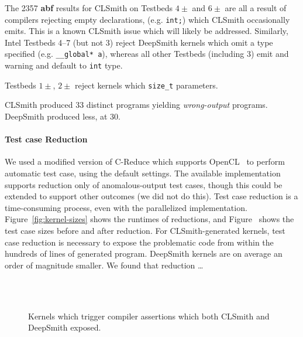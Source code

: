 The 2357 \textbf{abf} results for CLSmith on Testbeds $4\pm$ and $6\pm$ are all a result of compilers rejecting empty declarations, (e.g. \texttt{int;}) which CLSmith occasionally emits. This is a known CLSmith issue which will likely be addressed.
Similarly, Intel Testbeds 4--7 (but not 3) reject DeepSmith kernels which omit a type specified (e.g. \texttt{\_\_global* a}), whereas all other Testbeds (including 3) emit and warning and default to \texttt{int} type.

Testbeds $1\pm$, $2\pm$ reject kernels which \texttt{size\_t} parameters.

CLSmith produced 33 distinct programs yielding \emph{wrong-output} programs. DeepSmith produced less, at 30.


\paragraph{Test case Reduction} We used a modified version of C-Reduce which supports OpenCL~\cite{Pflanzer2016} to perform automatic test case, using the default settings. The available implementation supports reduction only of anomalous-output test cases, though this could be extended to support other outcomes (we did not do this). Test case reduction is a time-consuming process, even with the parallelized implementation. Figure~\ref{fig:kernel-sizes} shows the runtimes of reductions, and Figure~ shows the test case sizes before and after reduction. For CLSmith-generated kernels, test case reduction is necessary to expose the problematic code from within the hundreds of lines of generated program. DeepSmith kernels are on average an order of magnitude smaller. We found that reduction \ldots


\begin{figure}
  \centering %
  \\%
  \\%
  \caption{Kernels which trigger compiler assertions which both CLSmith and DeepSmith exposed.}%
  \label{lst:clsmith-compiler-assertions}%
\end{figure}


